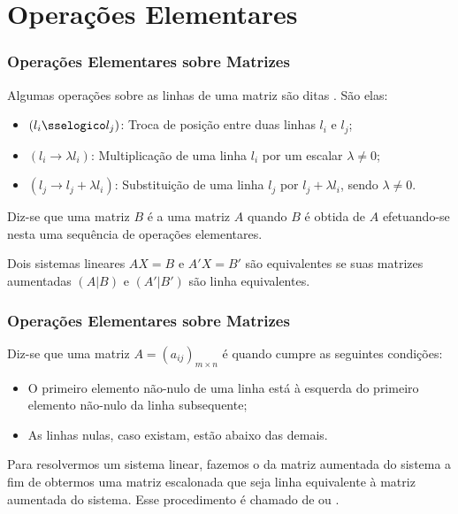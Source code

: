 \section{Operações Elementares}

\begin{frame}
    \frametitle{Operações Elementares sobre Matrizes}

    Algumas operações sobre as linhas de uma matriz são ditas . São elas:
    \begin{itemize}
        \item $(l_i \sselogico l_j)$: Troca de posição entre duas linhas  $l_i$ e $l_j$;
        \item $(l_i \to \lambda l_i)$: Multiplicação de uma linha $l_i$ por um escalar $\lambda \neq 0$;
        \item $(l_j \to l_j + \lambda l_i)$: Substituição de uma linha $l_j$ por $l_j +\lambda l_i$, sendo $\lambda \neq 0$.\pause
    \end{itemize}
    
    \begin{definicao}
        Diz-se que uma matriz $B$ é  a uma matriz $A$ quando $B$ é obtida de $A$ efetuando-se nesta uma sequência de operações elementares.
    \end{definicao}\pause

    \begin{proposicao}
        Dois sistemas lineares $AX=B$ e $A'X=B'$ são equivalentes se suas matrizes aumentadas $(A|B)$ e $(A'|B')$ são linha equivalentes.
    \end{proposicao}

\end{frame}


\begin{frame}
    \frametitle{Operações Elementares sobre Matrizes}

    \begin{definicao}
        Diz-se que uma matriz $A= (a_{ij})_{m \times n}$ é  quando cumpre as seguintes condições:
        \begin{itemize}
            \item O primeiro elemento não-nulo de uma linha está à esquerda do primeiro elemento não-nulo da linha subsequente;
            \item As linhas nulas, caso existam, estão abaixo das demais.
        \end{itemize}
    \end{definicao}\pause

    Para resolvermos um sistema linear, fazemos o  da matriz aumentada do sistema a fim de obtermos uma matriz escalonada que seja linha equivalente à matriz aumentada do sistema. Esse procedimento é chamado de  ou .
    

    
\end{frame}

